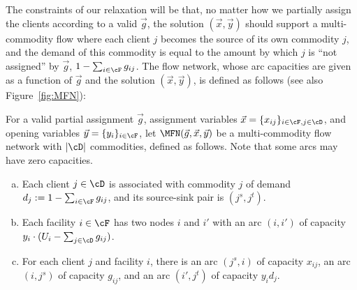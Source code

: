 The constraints of our relaxation will be that, no matter how we partially assign the clients according to a valid
$\vec{g}$, the solution $(\vec{x},\vec{y})$ should support a multi-commodity flow where each client $j$ becomes the source of its own commodity $j$, and the demand of this commodity is equal to the amount by which $j$ is ``not assigned'' by $\vec g$, $1-\sum_{i\in \cF} g_{ij}$. The flow network, whose arc capacities are given as a function of $\vec{g}$ and the solution $(\vec{x},\vec{y})$, is defined as follows (see also Figure~\ref{fig:MFN}):
\begin{definition}
\label{def:mfn}
For a valid partial assignment $\vec{g}$,  assignment variables $\vec{x} = \{x_{ij}\}_{i\in \cF, j\in \cD}$, and opening variables $ \vec{y}=
\{y_i\}_{i\in \cF}$, let $\MFN(\vec{g},\vec{x},\vec{y})$ be a
multi-commodity flow network with $|\cD|$ commodities, defined as follows. Note that some arcs may have zero capacities.
\begin{enumerate}[(a)]
\item Each client $j\in \cD$ is associated with commodity $j$ of demand $d_j := 1 - \sum_{i\in \cF} g_{ij}$, and its source-sink pair is $(j^s, j^t)$.  \item Each facility $i\in \cF$ has two nodes $i$ and $i'$ with an arc $( i,i')$ of capacity $y_i\cdot( U_i - \sum_{j\in \cD} g_{ij})$.  \item For each client $j$ and facility $i$, there is an arc $( j^s, i)$ of capacity $x_{ij}$, an arc
  $( i, j^s) $ of capacity $g_{ij}$, and an arc $( i', j^t) $ of capacity $y_i d_j$.
\end{enumerate}
\end{definition}


